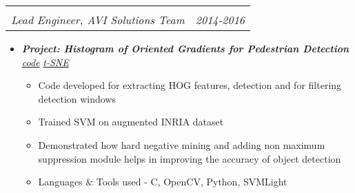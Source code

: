 \documentclass[letterpaper,11pt]{article}
\makeatletter
\def\CC{{C\nolinebreak[4]\hspace{-.05em}\raisebox{.4ex}{\tiny\bf ++}}}
\newcommand{\resitem}[1]{\item #1 \vspace{-2pt}}
\newcommand{\ressubheading}[4]{
	\begin{tabular*}{7.0in}{l@{\extracolsep{\fill}}r}
		\textbf{#1} & #2 \\
		\textit{#3} & \textit{#4} \\
	\end{tabular*}\vspace{-6pt}}
\makeatother
\begin{document}
\begin{itemize}
		\ressubheading{}{}{Lead Engineer, AVI Solutions Team}{2014-2016}
		\vspace{1mm}
		\begin{itemize}
				\resitem[]{\faCircleO \hspace{1mm}\textbf{\emph{Project: Histogram of Oriented Gradients for Pedestrian Detection}}\hspace{1mm}
					\faGithub \hspace{1mm} \href{https://github.com/nrupatunga/Pedestrain-Detection-using-Histogram-of-Oriented-Gradients}{\emph{code}}
					\faImage \hspace{1mm} \href{https://nrupatunga.github.io/project/hog/tsne.png}{\emph{t-SNE}}}
				\begin{itemize}
						\resitem{Code developed for extracting HOG features, detection and for filtering detection windows}
						\resitem{Trained SVM on augmented INRIA dataset }
						\resitem{Demonstrated how hard negative mining and adding non maximum suppression module helps in improving the accuracy of object detection}
						\resitem{Languages \& Tools used - \CC, OpenCV, Python, SVMLight}
				\end{itemize}


\end{itemize}
\end{itemize}
\end{document}

